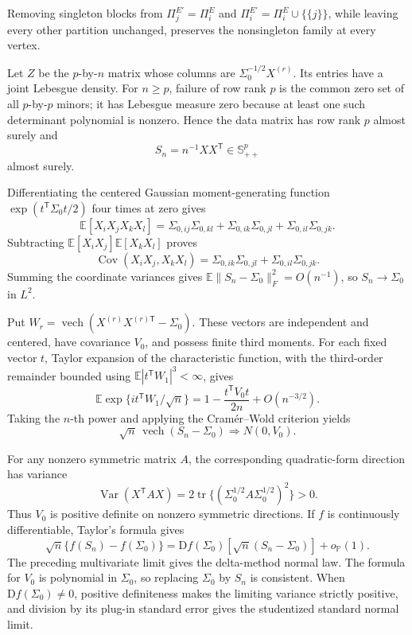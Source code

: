 Removing singleton blocks from \(\Pi^{E'}_j=\Pi^E_i\) and \(\Pi^{E'}_i=\Pi^E_i\cup\{\{j\}\}\), while leaving every other partition unchanged, preserves the nonsingleton family at every vertex.

Let \(Z\) be the \(p\)-by-\(n\) matrix whose columns are \(\Sigma_0^{-1/2}X^{(r)}\). Its entries have a joint Lebesgue density. For \(n\geq p\), failure of row rank \(p\) is the common zero set of all \(p\)-by-\(p\) minors; it has Lebesgue measure zero because at least one such determinant polynomial is nonzero. Hence the data matrix has row rank \(p\) almost surely and
\[
 S_n=n^{-1}XX^{\mathsf T}\in\mathbb S^p_{++}
\]
almost surely.

Differentiating the centered Gaussian moment-generating function \(\exp(t^{\mathsf T}\Sigma_0t/2)\) four times at zero gives
\[
 \mathbb E[X_iX_jX_kX_l]
 =\Sigma_{0,ij}\Sigma_{0,kl}
  +\Sigma_{0,ik}\Sigma_{0,jl}
  +\Sigma_{0,il}\Sigma_{0,jk}.
\]
Subtracting \(\mathbb E[X_iX_j]\mathbb E[X_kX_l]\) proves
\[
 \operatorname{Cov}(X_iX_j,X_kX_l)
 =\Sigma_{0,ik}\Sigma_{0,jl}+\Sigma_{0,il}\Sigma_{0,jk}.
\]
Summing the coordinate variances gives \(\mathbb E\|S_n-\Sigma_0\|_F^2=O(n^{-1})\), so \(S_n\to\Sigma_0\) in \(L^2\).

Put \(W_r=\operatorname{vech}(X^{(r)}X^{(r)\mathsf T}-\Sigma_0)\). These vectors are independent and centered, have covariance \(V_0\), and possess finite third moments. For each fixed vector \(t\), Taylor expansion of the characteristic function, with the third-order remainder bounded using \(\mathbb E|t^{\mathsf T}W_1|^3<\infty\), gives
\[
 \mathbb E\exp\{it^{\mathsf T}W_1/\sqrt n\}
 =1-\frac{t^{\mathsf T}V_0t}{2n}+O(n^{-3/2}).
\]
Taking the \(n\)-th power and applying the Cram\'er--Wold criterion yields
\[
 \sqrt n\,\operatorname{vech}(S_n-\Sigma_0)\Longrightarrow N(0,V_0).
\]

For any nonzero symmetric matrix \(A\), the corresponding quadratic-form direction has variance
\[
 \operatorname{Var}(X^{\mathsf T}AX)
 =2\operatorname{tr}\{(\Sigma_0^{1/2}A\Sigma_0^{1/2})^2\}>0.
\]
Thus \(V_0\) is positive definite on nonzero symmetric directions. If \(f\) is continuously differentiable, Taylor's formula gives
\[
 \sqrt n\{f(S_n)-f(\Sigma_0)\}
 =\mathrm Df(\Sigma_0)[\sqrt n(S_n-\Sigma_0)]+o_{\mathbb P}(1).
\]
The preceding multivariate limit gives the delta-method normal law. The formula for \(V_0\) is polynomial in \(\Sigma_0\), so replacing \(\Sigma_0\) by \(S_n\) is consistent. When \(\mathrm Df(\Sigma_0)\neq0\), positive definiteness makes the limiting variance strictly positive, and division by its plug-in standard error gives the studentized standard normal limit.

